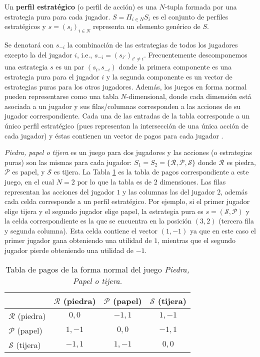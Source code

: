\begin{definition} Un \textbf{perfil estratégico} (o perfil de acción) es una $N$-tupla formada por una estrategia pura para cada jugador. $S = \Pi_{i \in N}S_i$ es el conjunto de perfiles estratégicos y $s = (s_i)_{i \in N}$ representa un elemento genérico de $S$.  
\end{definition}

Se denotará con $s_{-i}$ la combinación de las estrategias de todos los jugadores excepto la del jugador $i$, i.e., $s_{-i} = (s_{i'})_{i' \neq i}$. Frecuentemente descomponemos una estrategia $s$ es un par $(s_i,s_{-i})$ donde la primera componente es una estrategia pura para el jugador $i$ y la segunda componente es un vector de estrategias puras para los otros jugadores. Además, los juegos en forma normal pueden representarse como una tabla $N$-dimensional, donde cada dimensión está asociada a un jugador y sus filas/columnas corresponden a las acciones de su jugador correspondiente. Cada una de las entradas de la tabla corresponde a un único perfil estratégico (pues representan la intersección de una única acción de cada jugador) y éstas contienen un vector de pagos para cada jugador \cite{bib:introductionCFR}.

\textit{Piedra, papel o tijera} es un juego para dos jugadores y las acciones (o estrategias puras) son las mismas para cada jugador: $S_1 = S_2 = \{\mathcal{R}, \mathcal{P}, \mathcal{S} \}$ donde $\mathcal{R}$ es piedra, $\mathcal{P}$ es papel, y $\mathcal{S}$ es tijera. La Tabla \ref{table:pago-RPS} es la tabla de pagos correspondiente a este juego, en el cual $N = 2$ por lo que la tabla es de $2$ dimensiones. Las filas representan las acciones del jugador $1$ y las columnas las del jugador $2$, además cada celda corresponde a un perfil estratégico. Por ejemplo, si el primer jugador elige tijera y el segundo jugador elige papel, la estrategia pura es $s = (\mathcal{S}, \mathcal{P})$ y la celda correspondiente es la que se encuentra en la posición $(3, 2)$ (tercera fila y segunda columna). Esta celda contiene el vector $(1, -1)$ ya que en este caso el primer jugador gana obteniendo una utilidad de $1$, mientras que el segundo jugador pierde obteniendo una utilidad de $-1$.

\begin{table}[hbt!]
\begin{center}
\caption{Tabla de pagos de la forma normal del juego \textit{Piedra, Papel o tijera}.}
\label{table:pago-RPS}
\begin{tabular}{l c  c  c}
  & $\mathcal{R}$ (piedra) & $\mathcal{P}$ (papel) & $\mathcal{S}$ (tijera) \\ \midrule
$\mathcal{R}$ (piedra) & $0,0$ & $-1,1$ & $1,-1$ \\ 
$\mathcal{P}$ (papel) & $1,-1$ & $0,0$ & $-1,1$ \\ 
$\mathcal{S}$ (tijera) & $-1,1$ & $1,-1$ & $0,0$ \\ 
\end{tabular}
\end{center}
\end{table}


